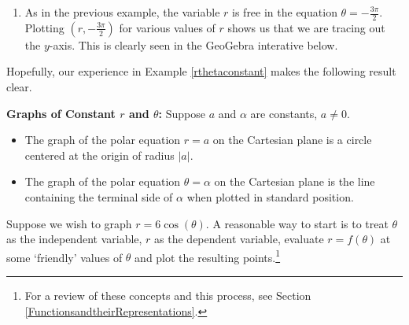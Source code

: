 \documentclass{ximera}
\begin{document}
\begin{example}
\begin{explanation}
\begin{enumerate}
\begin{center}
\end{center}

\item  As in the previous example, the variable $r$ is free in the equation $\theta  = -\frac{3\pi}{2}$.  Plotting $\left(r, -\frac{3\pi}{2}\right)$ for various values of $r$ shows us that we are tracing out the $y$-axis.  This is clearly seen in the GeoGebra interative below.

\begin{center}
\end{center}

\end{enumerate}

\end{explanation}


\end{example}

Hopefully, our experience in Example \ref{rthetaconstant} makes the following result clear.




\begin{theorem} \label{graphsofconstantrtheta}  \textbf{Graphs of Constant $r$ and $\theta$:} Suppose $a$ and $\alpha$ are constants, $a \neq 0$. 

\begin{itemize}

\item The graph of the polar equation $r = a$ on the Cartesian plane is a circle centered at the origin of radius $|a|$.

\item The graph of the polar equation $\theta = \alpha$ on the Cartesian plane is the line containing the terminal side of $\alpha$ when plotted in standard position.


\end{itemize}



\end{theorem}




Suppose we wish to graph $r = 6\cos(\theta)$.  A reasonable way to start is to treat $\theta$ as the independent variable, $r$ as the dependent variable,  evaluate $r = f(\theta)$ at some `friendly' values of $\theta$ and plot the resulting points.\footnote{For a review of these concepts and this process, see Section \ref{FunctionsandtheirRepresentations}.}  
\end{document}
